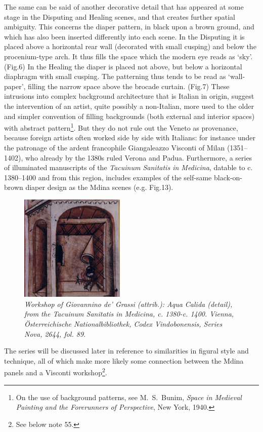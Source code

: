 \documentclass[a4paper,12pt]{article}
\begin{document}
The same can be said of another decorative detail that has appeared at
some stage in the Disputing and Healing scenes, and that creates
further spatial ambiguity.  This concerns the diaper pattern, in black
upon a brown ground, and which has also been inserted differently into
each scene. In the Disputing it is placed above a horizontal rear wall
(decorated with small cusping) and below the procenium-type arch. It
thus fills the space which the modern eye reads as `sky'. (Fig.6) In
the Healing the diaper is placed not above, but below a horizontal
diaphragm with small cusping. The patterning thus tends to be read as
`wall-paper', filling the narrow space above the brocade
curtain. (Fig.7) These intrusions into complex background architecture
that is Italian in origin, suggest the intervention of an artist,
quite possibly a non-Italian, more used to the older and simpler
convention of filling backgrounds (both external and interior spaces)
with abstract pattern\footnote{On the use of background patterns, see
M.~S.~Bunim, \textit{Space in Medieval Painting and the Forerunners of
Perspective}, New York, 1940.}. But they do not rule out the Veneto as
provenance, because foreign artists often worked side by side with
Italians: for instance under the patronage of the ardent francophile
Giangaleazzo Visconti of Milan (1351--1402), who already by the 1380s
ruled Verona and Padua. Furthermore, a series of illuminated
manuscripts of the \textit{Tacuinum Sanitatis in Medicina}, datable to
c. 1380--1400 and from this region, includes examples of the
self-same black-on-brown diaper design as the Mdina scenes
(e.g. Fig.13). 
\begin{figure}[htbp]
\centering
\includegraphics[width=5cm]{pics/fig13.png}
\caption[Workshop of Giovannino de' Grassi (attrib.): Aqua Calida
  (detail)]
{\it Workshop of Giovannino de' Grassi (attrib.): Aqua Calida (detail),
from the \textit{Tacuinum Sanitatis in Medicina}, c. 1380-c. 1400.
Vienna, \"Osterreichische Nationalbibliothek, Codex Vindobonensis,
Series Nova, 2644, fol. 89.} 
\end{figure}
The series will be discussed later in reference to
similarities in figural style and technique, all of which make more
likely some connection between the Mdina panels and a Visconti
workshop\footnote{See below note 55.}.
\end{document}
